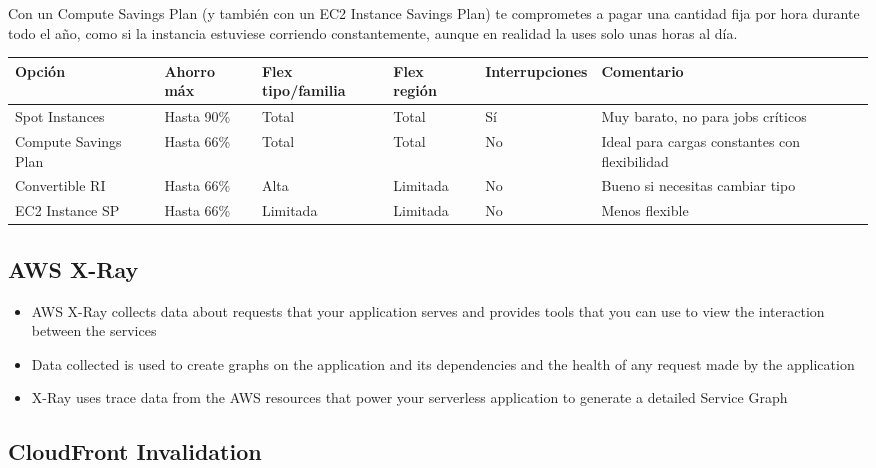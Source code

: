\documentclass[12pt,a4paper]{report}
\begin{document}
\begin{warningbox}[Importante]
Con un Compute Savings Plan (y también con un EC2 Instance Savings Plan) te comprometes a pagar una cantidad fija por hora durante todo el año, como si la instancia estuviese corriendo constantemente, aunque en realidad la uses solo unas horas al día.
\end{warningbox}

\begin{center}
\begin{longtable}{|p{3cm}|p{1.5cm}|p{2.5cm}|p{2.5cm}|p{2cm}|p{2cm}|}
\hline
\cellcolor{awsblue!20}\textbf{Opción} & \cellcolor{awsblue!20}\textbf{Ahorro máx} & \cellcolor{awsblue!20}\textbf{Flex tipo/familia} & \cellcolor{awsblue!20}\textbf{Flex región} & \cellcolor{awsblue!20}\textbf{Interrupciones} & \cellcolor{awsblue!20}\textbf{Comentario} \\
\hline
Spot Instances & Hasta 90\% & Total & Total & Sí & Muy barato, no para jobs críticos \\
\hline
\cellcolor{successgreen!20}Compute Savings Plan & Hasta 66\% & Total & Total & No & Ideal para cargas constantes con flexibilidad \\
\hline
Convertible RI & Hasta 66\% & Alta & Limitada & No & Bueno si necesitas cambiar tipo \\
\hline
EC2 Instance SP & Hasta 66\% & Limitada & Limitada & No & Menos flexible \\
\hline
\end{longtable}
\end{center}

\subsection{AWS X-Ray}

\begin{itemize}
    \item AWS X-Ray collects data about requests that your application serves and provides tools that you can use to view the interaction between the services
    \item Data collected is used to create graphs on the application and its dependencies and the health of any request made by the application
    \item X-Ray uses trace data from the AWS resources that power your serverless application to generate a detailed Service Graph
\end{itemize}

\subsection{CloudFront Invalidation}
\end{document}
